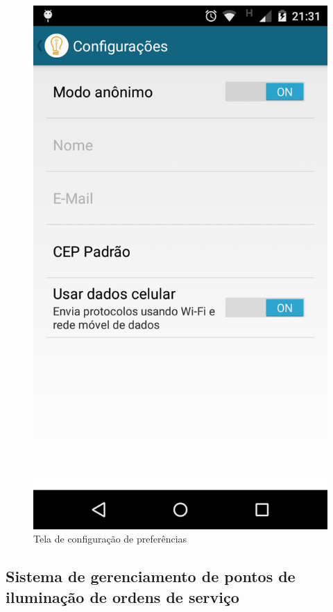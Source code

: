 \documentclass[
	article,			%
	11pt,				%
	oneside,			%
	a4paper,			%
	english,			%
	brazil,				%
	sumario=tradicional
	]{abntex2}
\begin{document}
\begin{figure}[!htbp]
 \centering
  \begin{minipage}{0.4\textwidth}
    \centering
    \caption{\label{android-tela-preferencias}Tela de configuração de preferências}
    \includegraphics[scale=0.1]{android/9.png}
  \end{minipage}
\end{figure}

\subsection{Sistema de gerenciamento de pontos de iluminação de ordens de serviço}
\end{document}
